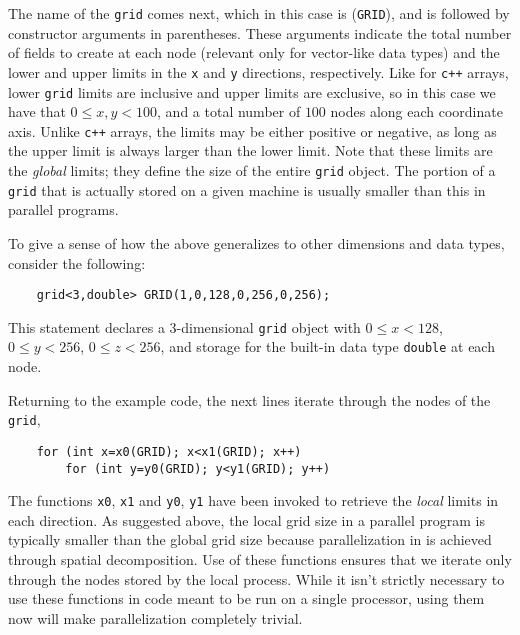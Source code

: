 The name of the {\tt grid} comes next, which in this case is ({\tt GRID}), and is followed by constructor arguments in parentheses.  These arguments indicate the total number of fields to create at each node (relevant only for vector-like data types) and the lower and upper limits in the {\tt x} and {\tt y} directions, respectively.  Like for {\tt c++} arrays, lower {\tt grid} limits are inclusive and upper limits are exclusive, so in this case we have that $0\leq x,y<100$, and a total number of $100$ nodes along each coordinate axis.  Unlike {\tt c++} arrays, the limits may be either positive or negative, as long as the upper limit is always larger than the lower limit.  Note that these limits are the {\em global} limits; they define the size of the entire {\tt grid} object.  The portion of a {\tt grid} that is actually stored on a given machine is usually smaller than this in parallel programs.

To give a sense of how the above generalizes to other dimensions and data types, consider the following:
\begin{shadebox}
\begin{verbatim}
    grid<3,double> GRID(1,0,128,0,256,0,256);
\end{verbatim}
\end{shadebox}
This statement declares a 3-dimensional {\tt grid} object with $0\leq x<128$, $0\leq y<256$, $0\leq z<256$, and storage for the built-in data type {\tt double} at each node.

Returning to the example code, the next lines iterate through the nodes of the {\tt grid},
\begin{shadebox}
\begin{verbatim}
    for (int x=x0(GRID); x<x1(GRID); x++)
        for (int y=y0(GRID); y<y1(GRID); y++)
\end{verbatim}
\end{shadebox}
The functions {\tt x0}, {\tt x1} and {\tt y0}, {\tt y1} have been invoked to retrieve the {\em local} limits in each direction.  As suggested above, the local grid size in a parallel program is typically smaller than the global grid size because parallelization in \MMSP is achieved through spatial decomposition.  Use of these functions ensures that we iterate only through the nodes stored by the local process.  While it isn't strictly necessary to use these functions in code meant to be run on a single processor, using them now will make parallelization completely trivial.

